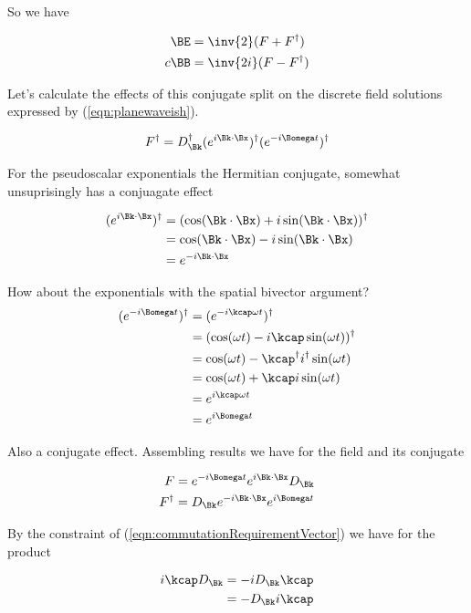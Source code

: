 So we have 

\begin{align}
\BE &= \inv{2}(F + F^\dagger) \\
c \BB &= \inv{2i}(F - F^\dagger)
\end{align}

Let's calculate the effects of this conjugate split on the discrete field solutions expressed by 
(\ref{eqn:planewaveish}).

\begin{align*}
F^\dagger &= D_\Bk^\dagger (e^{i \Bk \cdot \Bx})^\dagger (e^{-i\Bomega t})^\dagger \\
\end{align*}

For the pseudoscalar exponentials the Hermitian conjugate, somewhat unsuprisingly has a conjuagate effect

\begin{align*}
(e^{i \Bk \cdot \Bx})^\dagger
&= 
(\cos(\Bk \cdot \Bx) +i\sin(\Bk \cdot \Bx))^\dagger \\
&= 
\cos(\Bk \cdot \Bx) -i\sin(\Bk \cdot \Bx) \\
&= 
e^{-i\Bk \cdot \Bx}
\end{align*}

How about the exponentials with the spatial bivector argument?
\begin{align*}
(e^{-i\Bomega t})^\dagger 
&=
(e^{-i \kcap \omega t})^\dagger  \\
&=
(\cos(\omega t) - i \kcap \sin(\omega t))^\dagger \\
&=
\cos(\omega t) - \kcap^\dagger i^\dagger \sin(\omega t) \\
&=
\cos(\omega t) + \kcap i \sin(\omega t) \\
&= 
e^{i \kcap \omega t} \\
&= 
e^{i \Bomega t} 
\end{align*}

Also a conjugate effect.  Assembling results we have for the field and its conjugate

\begin{align*}
F &= e^{-i\Bomega t} e^{i \Bk \cdot \Bx} D_\Bk  \\
F^\dagger &= D_\Bk e^{-i \Bk \cdot \Bx} e^{i\Bomega t}
\end{align*}

By the constraint of (\ref{eqn:commutationRequirementVector}) we have for the product

\begin{align*}
i \kcap D_\Bk 
&= 
-i D_\Bk \kcap \\
&= 
- D_\Bk i \kcap \\
\end{align*}

